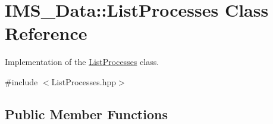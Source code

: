 \hypertarget{classIMS__Data_1_1ListProcesses}{
\section{IMS\_\-Data::ListProcesses Class Reference}
\label{classIMS__Data_1_1ListProcesses}
}


Implementation of the \hyperlink{classIMS__Data_1_1ListProcesses}{ListProcesses} class.  




{\ttfamily \#include $<$ListProcesses.hpp$>$}

\subsection*{Public Member Functions}
